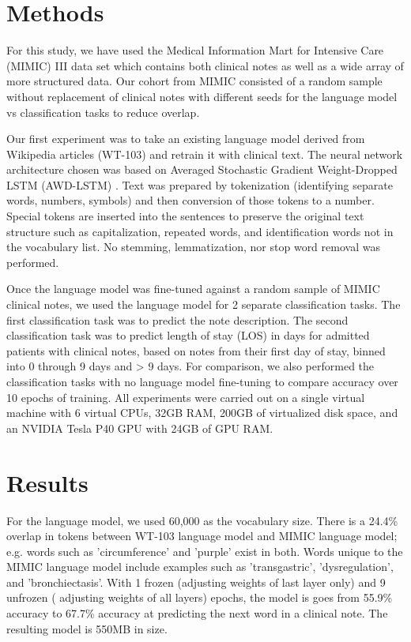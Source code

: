 \documentclass{amia}
\begin{document}
\section*{Methods}

For this study, we have used the Medical Information Mart for Intensive Care (MIMIC) III \cite{johnson_mimic-iii_2016} data set which contains both clinical notes as well as a wide array of more structured data. Our cohort from MIMIC consisted of a random sample without replacement of clinical notes with different seeds for the language model vs classification tasks to reduce overlap.

Our first experiment was to take an existing language model derived from Wikipedia articles (WT-103) \cite{Merity2016Sep} and retrain it with clinical text. The neural network architecture chosen was based on Averaged Stochastic Gradient Weight-Dropped LSTM (AWD-LSTM) \cite{Merity2017Aug}. Text was prepared by tokenization (identifying separate words, numbers, symbols) and then conversion of those tokens to a number. Special tokens are inserted into the sentences to preserve the original text structure such as capitalization, repeated words, and identification words not in the vocabulary list. No stemming, lemmatization, nor stop word removal was performed.

Once the language model was fine-tuned against a random sample of MIMIC clinical notes, we used the language model for 2 separate classification tasks. The first classification task was to predict the note description. The second classification task was to predict length of stay (LOS) in days for admitted patients with clinical notes, based on notes from their first day of stay, binned into 0 through 9 days and > 9 days. For comparison, we also performed the classification tasks with no language model fine-tuning to compare accuracy over 10 epochs of training. All experiments were carried out on a single virtual machine with 6 virtual CPUs, 32GB RAM, 200GB of virtualized disk space, and an NVIDIA Tesla P40 GPU with 24GB of GPU RAM.

\section*{Results}

For the language model, we used 60,000 as the vocabulary size. There is a 24.4\% overlap in tokens between WT-103 language model and MIMIC language model; e.g. words such as 'circumference' and 'purple' exist in both. Words unique to the MIMIC language model include examples such as 'transgastric', 'dysregulation', and 'bronchiectasis'. With 1 frozen (adjusting weights of last layer only) and 9 unfrozen ( adjusting weights of all layers) epochs, the model is goes from 55.9\% accuracy to 67.7\% accuracy at predicting the next word in a clinical note. The resulting model is 550MB in size.
\end{document}
